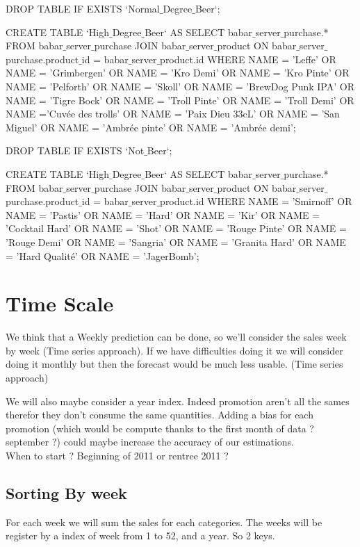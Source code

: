 \documentclass{report}
\begin{document}
DROP TABLE IF EXISTS `Normal$\_$Degree$\_$Beer`;

CREATE TABLE `High$\_$Degree$\_$Beer` 
	AS SELECT babar$\_$server$\_$purchase.* FROM babar$\_$server$\_$purchase JOIN babar$\_$server$\_$product ON babar$\_$server$\_$purchase.product$\_$id = babar$\_$server$\_$product.id WHERE
	NAME = 'Leffe' OR NAME = 'Grimbergen' OR NAME = 'Kro Demi' OR NAME = 'Kro Pinte' OR NAME = 'Pelforth' OR NAME = 'Skoll' OR NAME = 'BrewDog Punk IPA' 
	OR NAME = 'Tigre Bock' OR NAME = 'Troll Pinte' OR NAME = 'Troll Demi' OR NAME ='Cuvée des trolls' OR NAME = 'Paix Dieu 33cL' OR NAME = 'San Miguel'
	OR NAME = 'Ambrée pinte' OR NAME = 'Ambrée demi';
	
	
	
DROP TABLE IF EXISTS `Not$\_$Beer`;

CREATE TABLE `High$\_$Degree$\_$Beer` 
	AS SELECT babar$\_$server$\_$purchase.* FROM babar$\_$server$\_$purchase JOIN babar$\_$server$\_$product ON babar$\_$server$\_$purchase.product$\_$id = babar$\_$server$\_$product.id WHERE
	NAME = 'Smirnoff' OR NAME = 'Pastis' OR NAME = 'Hard' OR NAME = 'Kir' OR NAME = 'Cocktail Hard' OR NAME = 'Shot' OR NAME = 'Rouge Pinte' OR NAME = 'Rouge Demi' 
	OR NAME = 'Sangria' OR NAME = 'Granita Hard' OR NAME = 'Hard Qualité' OR NAME  = 'JagerBomb';
	

\section{Time Scale}

We think that a Weekly prediction can be done, so we'll consider the sales week by week (Time series approach). If we have difficulties doing it we will consider doing it monthly but then the forecast would be much less usable. (Time series approach)

We will also maybe consider a year index. Indeed promotion aren't all the sames therefor they don't consume the same quantities. Adding a bias for each promotion (which would be compute thanks to the first month of data ? september ?) could maybe increase the accuracy of our estimations.\\
When to start ? Beginning of 2011 or rentree 2011 ?

\subsection{Sorting By week}

For each week we will sum the sales for each categories. The weeks will be register by a index of week from 1 to 52, and a year. So 2 keys. 
\end{document}
